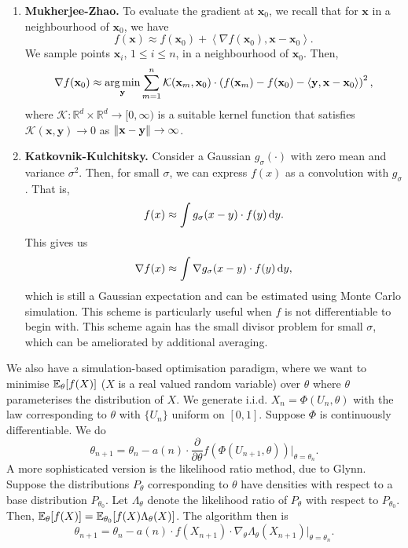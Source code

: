 \begin{enumerate}
    \item \textbf{Mukherjee-Zhao.} To evaluate the gradient at $\mathbf{x}_0$, we recall that for $\mathbf{x}$ in a neighbourhood of $\mathbf{x}_0$, we have
    \[
        f(\mathbf{x}) \approx f(\mathbf{x}_0) + \left\langle \nabla f(\mathbf{x}_0), \mathbf{x} - \mathbf{x}_0 \right\rangle.
    \]
    We sample points $\mathbf{x}_i$, $1 \leq i \leq n$, in a neighbourhood of $\mathbf{x}_0$. Then, 
    \[
        \nabla f(\mathbf{x}_0) \approx \operatorname*{arg\,min}_{\mathbf{y}} \sum_{m=1}^n \mathcal{K}(\mathbf{x}_m, \mathbf{x}_0) \cdot \left( f(\mathbf{x}_m) - f(\mathbf{x}_0) - \left\langle \mathbf{y}, \mathbf{x} - \mathbf{x}_0 \right\rangle \right)^2,
    \]
    where $\mathcal{K} \colon \mathbb{R}^d \times \mathbb{R}^d \to [0,\infty)$ is a suitable kernel function that satisfies $\mathcal{K}(\mathbf{x}, \mathbf{y}) \to 0$ as $\norm{\mathbf{x-y}} \to \infty$. 
    
    \item \textbf{Katkovnik-Kulchitsky.} Consider a Gaussian $g_{\sigma}(\cdot)$ with zero mean and variance $\sigma^2$. Then, for small $\sigma$, we can express $f(x)$ as a convolution with $g_{\sigma}$. That is,
    \[
        f(x) \approx \int g_{\sigma}(x-y) \cdot f(y) \, \mathrm{d} y.
    \]
    This gives us
    \[
        \nabla f(x) \approx \int \nabla g_{\sigma}(x-y) \cdot f(y) \, \mathrm{d} y,
    \]
    which is still a Gaussian expectation and can be estimated using Monte Carlo simulation. This scheme is particularly useful when $f$ is not differentiable to begin with. This scheme again has the small divisor problem for small $\sigma$, which can be ameliorated by additional averaging. 
\end{enumerate}

We also have a simulation-based optimisation paradigm, where we want to minimise $\mathbb{E}_{\theta} [f(X)]$ ($X$ is a real valued random variable) over $\theta$ where $\theta$ parameterises the distribution of $X$. We generate i.i.d. $X_n = \Phi(U_n, \theta)$ with the law corresponding to $\theta$ with $\{U_n\}$ uniform on $[0,1]$. Suppose $\Phi$ is continuously differentiable. We do
\[
    \theta_{n+1} = \theta_n - a(n) \cdot \frac{\partial}{\partial \theta} f\left( \Phi(U_{n+1}, \theta) \right) \bigg\rvert_{\theta = \theta_n}.
\]
A more sophisticated version is the likelihood ratio method, due to Glynn. Suppose the distributions $P_{\theta}$ corresponding to $\theta$ have densities with respect to a base distribution $P_{\theta_0}$. Let $\Lambda_{\theta}$ denote the likelihood ratio of $P_{\theta}$ with respect to $P_{\theta_0}$. Then, $\mathbb{E}_{\theta} [f(X)] = \mathbb{E}_{\theta_0}[f(X) \Lambda_{\theta}(X)]$. The algorithm then is
\[
    \theta_{n+1} = \theta_n - a(n)\cdot f(X_{n+1})\cdot \nabla_{\theta} \Lambda_{\theta}(X_{n+1}) \bigg\rvert_{\theta = \theta_n}.
\]

